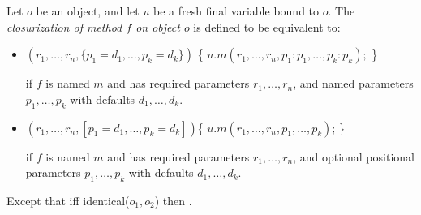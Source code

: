 \documentclass{article}
\newcommand{\code}[1]{{\sf #1}}
\begin{document}
\LMHash{}
Let $o$ be an object, and let $u$ be a fresh final variable bound to $o$.
The {\em closurization of method $f$ on object $o$} is defined to be equivalent to:
\begin{itemize}
\item
\begin{dartCode}
$(r_1, \ldots, r_n, \{p_1 = d_1, \ldots , p_k = d_k\})$ \{
  \RETURN{} $ u.m(r_1, \ldots, r_n, p_1: p_1, \ldots, p_k: p_k);$
\}
\end{dartCode}
if $f$ is named $m$ and has required parameters $r_1, \ldots, r_n$, and named parameters $p_1, \ldots, p_k$ with defaults $d_1, \ldots, d_k$.
\item
\begin{dartCode}
$(r_1, \ldots, r_n, [p_1 = d_1, \ldots , p_k = d_k])$\{
  \RETURN{} $u.m(r_1, \ldots, r_n, p_1, \ldots, p_k)$;
\}
\end{dartCode}
if $f$ is named $m$ and has required parameters $r_1, \ldots, r_n$, and optional positional parameters $p_1, \ldots, p_k$ with defaults $d_1, \ldots, d_k$.
\end{itemize}

\LMHash{}
Except that iff  \code{identical($o_1, o_2$)}  then .


\end{document}
